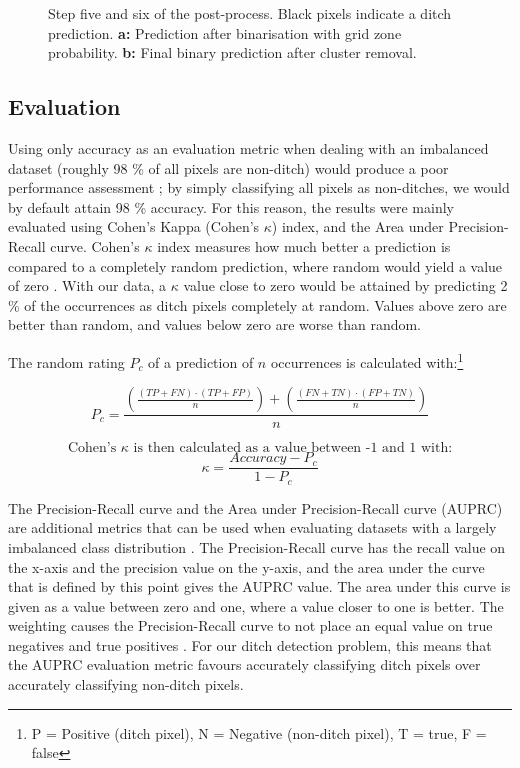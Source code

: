 \documentclass[]{interact}
\theoremstyle{plain}%
\theoremstyle{definition}
\theoremstyle{remark}
\begin{document}
\begin{figure} [!htb]
    \caption{Step five and six of the post-process. Black pixels indicate a ditch prediction. \textbf{a: }Prediction after binarisation with grid zone probability. \textbf{b: }Final binary prediction after cluster removal.}
    \label{fig:postprocessing3}
\end{figure}

\subsection{Evaluation} \label{evaluation}

Using only accuracy as an evaluation metric when dealing with an imbalanced dataset (roughly 98 \% of all pixels are non-ditch) would produce a poor performance assessment \citep{balanced}; by simply classifying all pixels as non-ditches, we would by default attain 98 \% accuracy. For this reason, the results were mainly evaluated using Cohen's Kappa (Cohen's $\kappa$) index, and the Area under Precision-Recall curve. Cohen's $\kappa$ index measures how much better a prediction is compared to a completely random prediction, where random would yield a value of zero \citep{kappa123}. With our data, a $\kappa$ value close to zero would be attained by predicting 2 \% of the occurrences as ditch pixels completely at random. Values above zero are better than random, and values below zero are worse than random.

\newpage

The random rating $P_c$ of a prediction of $n$ occurrences is calculated with:\footnote{ P = Positive (ditch pixel), N = Negative (non-ditch pixel), T = true, F = false}

$$
P_c = \frac{\left(\frac{(TP + FN) \cdot (TP + FP)}{n}\right) + \left(\frac{(FN + TN) \cdot (FP + TN)}{n}\right)}{n}
$$

$$
\text{Cohen's } \kappa \text{ is then calculated as a value between -1 and 1 with:}
$$
$$\kappa = \frac{Accuracy - P_c}{1 - P_c}$$

The Precision-Recall curve and the Area under Precision-Recall curve (AUPRC) are additional metrics that can be used when evaluating datasets with a largely imbalanced class distribution \citep{precision_recall_curve}. The Precision-Recall curve has the recall value on the x-axis and the precision value on the y-axis, and the area under the curve that is defined by this point gives the AUPRC value. The area under this curve is given as a value between zero and one, where a value closer to one is better. The weighting causes the Precision-Recall curve to not place an equal value on true negatives and true positives \citep{precision_recall_curve}. For our ditch detection problem, this means that the AUPRC evaluation metric favours accurately classifying ditch pixels over accurately classifying non-ditch pixels.
\end{document}
